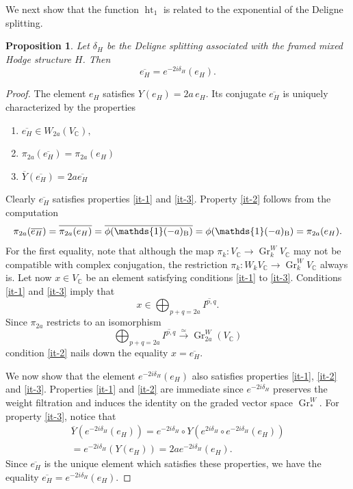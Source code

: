 \documentclass[11pt,a4paper]{amsart}
\newcommand{\Betti}{\text{\rm B}}
\newcommand{\C}{\mathds{C}}
\newcommand{\bfone}{{\mathds{1}}}
\DeclareMathOperator {\Gr} {Gr}
\DeclareMathOperator{\Ht}{ht}
\numberwithin{equation}{section}
\theoremstyle{plain}
\newtheorem{prop}{Proposition}[section]
\theoremstyle{definition}
\begin{document}
We next show that the function $\Ht_{1}$ is related to the exponential
of the Deligne splitting.
\begin{prop}\label{prop-ht-1-delta}
Let $\delta_{H}$ be the Deligne splitting associated with the framed mixed Hodge structure $H$. Then 
\begin{displaymath}
  \overline{e_{H}}=
  e^{-2i\delta_{H}}(e_{H}).
\end{displaymath}
\end{prop}
\begin{proof}
  The element $e_{H}$ satisfies $Y(e_{H})=2a\, e_{H}$. Its conjugate $\overline {e_{H}}$ is
  uniquely characterized by the properties 
\begin{enumerate}
\item\label{it-1}
  $\overline{e_{H}}\in W_{2a}(V_{\C}),$
\item\label{it-2} $\pi _{2a}(\overline {e_{H}})=\pi _{2a}(e_{H})$
\item\label{it-3}
$\overline{Y}(\overline{e_{H}})=2a\overline{e_{H}}$
\end{enumerate}
 Clearly $\overline{e_{H}}$ satisfies properties \ref{it-1} and
\ref{it-3}. Property \ref{it-2} follows from the computation
\begin{displaymath}
  \pi _{2a}(\overline {e_{H}})=
  \overline {\pi _{2a}(e_{H})}
  =\overline{\phi(\bfone(-a)_{\Betti})}=\phi(\bfone(-a)_{\Betti})
  =\pi _{2a}(e_{H}).
\end{displaymath}
 For
  the first equality, note that although the map $\pi _{k}\colon
  V_{\C}\to \Gr_{k}^{W}V_{\C}$ may not be compatible with complex
  conjugation, the restriction $\pi _{k}\colon
  W_{k}V_{\C}\to \Gr_{k}^{W}V_{\C}$ always is.
  Let now $x\in V_{\C}$ be an element satisfying conditions \ref{it-1}
  to \ref{it-3}. Conditions \ref{it-1}
  and \ref{it-3} imply that
  \begin{displaymath}
    x\in \bigoplus _{p+q=2a}\overline{I^{p,q}}.
  \end{displaymath}
  Since $\pi _{2a}$ restricts to an isomorphism
  \begin{displaymath}
    \bigoplus _{p+q=2a}\overline{I^{p,q}} \overset{\simeq}{\longrightarrow}
    \Gr_{2a}^{W}(V_{\C})
\end{displaymath}
condition \ref{it-2} nails down the equality $x=\overline{e_{H}}$.

We now show that the element $e^{-2i\delta_{H}}(e_{H})$ also
  satisfies properties \ref{it-1}, \ref{it-2} and
  \ref{it-3}. Properties \ref{it-1} and \ref{it-2} are immediate since
  $e^{-2i\delta_{H}}$ preserves the weight filtration and induces the
  identity on the graded vector space $\Gr^{W}_{\ast}$. For property
  \ref{it-3}, notice that
\begin{multline*}
  \overline{Y}\left(e^{-2i\delta_{H}}(e_{H})\right)=
  e^{-2i\delta_{H}} \circ Y\left(e^{2i\delta_{H}}\circ e^{-2i\delta_{H}}(e_{H})\right)\\
  =e^{-2i\delta_{H}} (Y(e_{H}))
  =2a e^{-2i\delta_{H}} (e_{H}).
\end{multline*}
 Since $\overline{e_{H}}$ is the unique element which satisfies these
 properties, we have the equality $\overline {e_{H}}= e^{-2i\delta_{H}} (e_{H})$. 
\end{proof}
\end{document}
